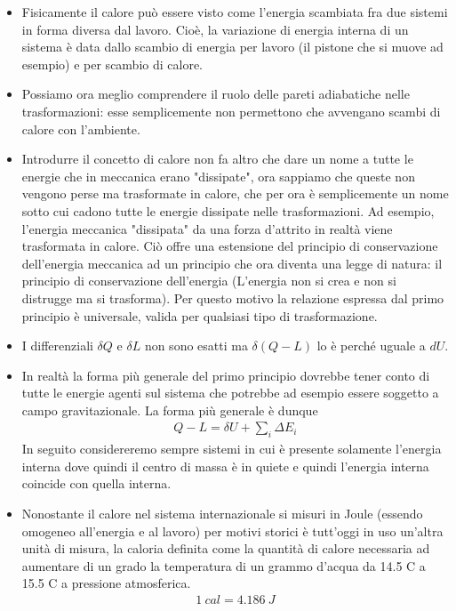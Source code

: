\documentclass[10pt,a4paper]{article}
\begin{document}
\begin{itemize}
\item Fisicamente il calore può essere visto come l'energia scambiata fra due sistemi in forma diversa dal lavoro. Cioè, la variazione di energia interna di un sistema è data dallo scambio di energia per lavoro (il pistone che si muove ad esempio)  e per scambio di calore.
\item Possiamo ora meglio comprendere il ruolo delle pareti adiabatiche nelle trasformazioni: esse semplicemente non permettono che avvengano scambi di calore con l'ambiente.
\item Introdurre il concetto di calore non fa altro che dare un nome a tutte le energie che in meccanica erano "dissipate", ora sappiamo che queste non vengono perse ma trasformate in calore, che per ora è semplicemente un nome sotto cui cadono tutte le energie dissipate nelle trasformazioni. Ad esempio, l'energia meccanica "dissipata" da una forza d'attrito in realtà viene trasformata in calore. Ciò offre una estensione del principio di conservazione dell'energia meccanica ad un principio che ora diventa una legge di natura: il principio di conservazione dell'energia (L'energia non si crea e non si distrugge ma si trasforma). Per questo motivo la relazione espressa dal primo principio è universale, valida per qualsiasi tipo di trasformazione. 
\item I differenziali $\delta Q$ e $\delta L$ non sono esatti ma $\delta(Q-L)$ lo è perché uguale a $dU$.
\item In realtà la forma più generale del primo principio dovrebbe tener conto di tutte le energie agenti sul sistema che potrebbe ad esempio essere soggetto a campo gravitazionale. La forma più generale è dunque
\begin{align*}
	Q-L = \delta U + \sum_i \Delta E_i
\end{align*}
In seguito considereremo sempre sistemi in cui è presente solamente l'energia interna dove quindi il centro di massa è in quiete e quindi l'energia interna coincide con quella interna. 
\item Nonostante il calore nel sistema internazionale si misuri in Joule (essendo omogeneo all'energia e al lavoro) per motivi storici è tutt'oggi in uso un'altra unità di misura, la caloria definita come la quantità di calore necessaria ad aumentare di un grado la temperatura di un grammo d'acqua da 14.5 C a 15.5 C a pressione atmosferica. 
\begin{align*}
	1\ cal = 4.186\ J
\end{align*}

\end{itemize}
\end{document}

